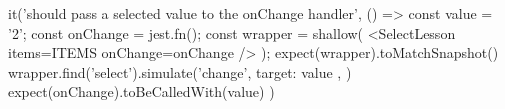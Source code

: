 it('should pass a selected value to the onChange handler', () => {
    const value = '2';
    const onChange = jest.fn();
    const wrapper = shallow(
        <SelectLesson items={ITEMS} onChange={onChange} />
    );
    expect(wrapper).toMatchSnapshot()
        wrapper.find('select').simulate('change', {
        target: { value },
    })
    expect(onChange).toBeCalledWith(value)
})
